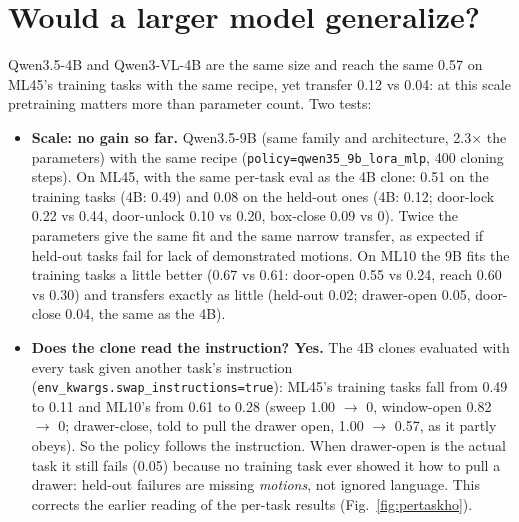 \documentclass[11pt]{article}
\newcommand{\code}[1]{\texttt{#1}}
\begin{document}
\section{Would a larger model generalize?}
\label{sec:scale}
Qwen3.5-4B and Qwen3-VL-4B are the same size and reach the same 0.57 on ML45's training tasks with the same recipe, yet
transfer 0.12 vs 0.04: at this scale pretraining matters more than parameter count. Two tests:
\begin{itemize}
\item \textbf{Scale: no gain so far.} Qwen3.5-9B (same family and architecture, 2.3$\times$ the parameters) with the same
  recipe (\code{policy=qwen35\_9b\_lora\_mlp}, 400 cloning steps). On ML45, with the same per-task eval as the 4B clone:
  0.51 on the training tasks (4B: 0.49) and 0.08 on the held-out ones (4B: 0.12; door-lock 0.22 vs 0.44, door-unlock 0.10 vs
  0.20, box-close 0.09 vs 0). Twice the parameters give the same fit and the same narrow transfer, as expected if held-out
  tasks fail for lack of demonstrated motions. On ML10 the 9B fits the training tasks a little better (0.67 vs 0.61:
  door-open 0.55 vs 0.24, reach 0.60 vs 0.30) and transfers exactly as little (held-out 0.02; drawer-open 0.05, door-close
  0.04, the same as the 4B).
\item \textbf{Does the clone read the instruction? Yes.} The 4B clones evaluated with every task given another task's
  instruction (\code{env\_kwargs.swap\_instructions=true}): ML45's training tasks fall from 0.49 to 0.11 and ML10's from 0.61
  to 0.28 (sweep 1.00 $\to$ 0, window-open 0.82 $\to$ 0; drawer-close, told to pull the drawer open, 1.00 $\to$ 0.57, as it
  partly obeys). So the policy follows the instruction. When drawer-open is the actual task it still fails (0.05) because no
  training task ever showed it how to pull a drawer: held-out failures are missing \emph{motions}, not ignored language.
  This corrects the earlier reading of the per-task results (Fig.~\ref{fig:pertaskho}).
\end{itemize}
\end{document}
